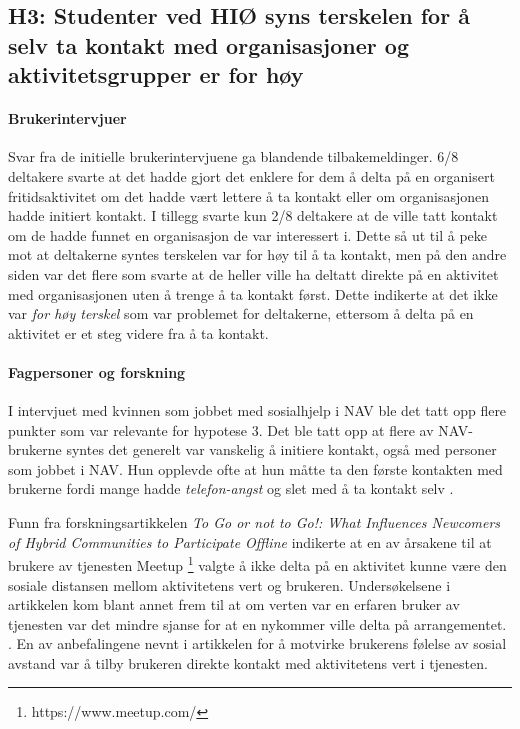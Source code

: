 \subsection{H3: Studenter ved HIØ syns terskelen for å selv ta kontakt med organisasjoner og aktivitetsgrupper er for høy}

\paragraph{Brukerintervjuer}
Svar fra de initielle brukerintervjuene ga blandende tilbakemeldinger. 6/8 deltakere svarte at det hadde gjort det enklere for dem å delta på en organisert fritidsaktivitet om det hadde vært lettere å ta kontakt eller om organisasjonen hadde initiert kontakt. I tillegg svarte kun 2/8 deltakere at de ville tatt kontakt om de hadde funnet en organisasjon de var interessert i. Dette så ut til å peke mot at deltakerne syntes terskelen var for høy til å ta kontakt, men på den andre siden var det flere som svarte at de heller ville ha deltatt direkte på en aktivitet med organisasjonen uten å trenge å ta kontakt først. Dette indikerte at det ikke var {\em for høy terskel} som var problemet for deltakerne, ettersom å delta på en aktivitet er et steg videre fra å ta kontakt.

\paragraph{Fagpersoner og forskning}
I intervjuet med kvinnen som jobbet med sosialhjelp i NAV ble det tatt opp flere punkter som var relevante for hypotese 3. Det ble tatt opp at flere av NAV-brukerne syntes det generelt var vanskelig å initiere kontakt, også med personer som jobbet i NAV. Hun opplevde ofte at hun måtte ta den første kontakten med brukerne fordi mange hadde {\em telefon-angst} og slet med å ta kontakt selv \cite{NAV-INTERVJU:16}.

Funn fra forskningsartikkelen {\em To Go or not to Go!: What Influences Newcomers of Hybrid Communities to Participate Offline} indikerte at en av årsakene til at brukere av tjenesten Meetup \footnote{https://www.meetup.com/} valgte å ikke delta på en aktivitet kunne være den sosiale distansen mellom aktivitetens vert og brukeren. Undersøkelsene i artikkelen kom blant annet frem til at om verten var en erfaren bruker av tjenesten var det mindre sjanse for at en nykommer ville delta på arrangementet. . En av anbefalingene nevnt i artikkelen for å motvirke brukerens følelse av sosial avstand var å tilby brukeren direkte kontakt med aktivitetens vert i tjenesten. \cite{NEWCOMERS:4:CT17}

